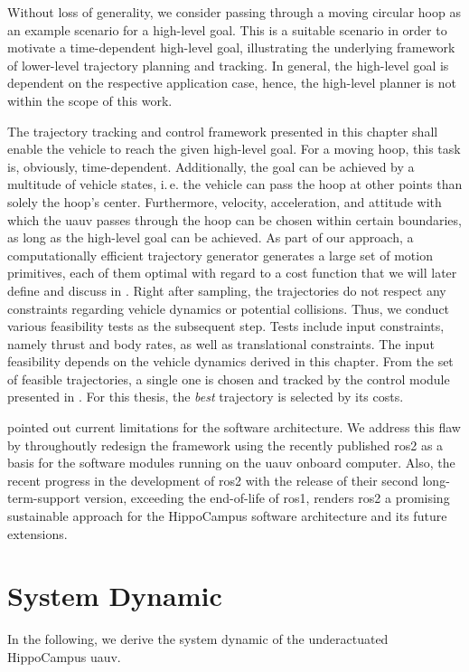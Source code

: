 Without loss of generality, we consider passing through a moving circular hoop as an example scenario for a high-level goal. This is a suitable scenario in order to motivate a time-dependent high-level goal, illustrating the underlying framework of lower-level trajectory planning and tracking. In general, the high-level goal is dependent on the respective application case, hence, the high-level planner is not within the scope of this work.

The trajectory tracking and control framework presented in this chapter shall enable the vehicle to reach the given high-level goal. For a moving hoop, this task is, obviously, time-dependent. Additionally, the goal can be achieved by a multitude of vehicle states, i.\,e. the vehicle can pass the hoop at other points than solely the hoop's center.
Furthermore, velocity, acceleration, and attitude with which the \ac{uauv} passes through the hoop can be chosen within certain boundaries, as long as the high-level goal can be achieved.
As part of our approach, a computationally efficient trajectory generator generates a large set of motion primitives, each of them optimal with regard to a cost function that we will later define and discuss in .
Right after sampling, the trajectories do not respect any constraints regarding vehicle dynamics or potential collisions. 
Thus, we conduct various feasibility tests as the subsequent step.
Tests include input constraints, namely thrust and body rates, as well as translational constraints.
The input feasibility depends on the vehicle dynamics derived in this chapter.
From the set of feasible trajectories, a single one is chosen and tracked by the control module presented in . 
For this thesis, the \emph{best} trajectory is selected by its costs.

 pointed out current limitations for the software architecture.
We address this flaw by throughoutly redesign the framework using the recently published \ac{ros2} as a basis for the software modules running on the \ac{uauv} onboard computer.
Also, the recent progress in the development of \ac{ros2} with the release of their second long-term-support version, exceeding the end-of-life of \ac{ros}1, renders \ac{ros2} a promising sustainable approach for the HippoCampus software architecture and its future extensions.

\section{System Dynamic}
\label{sec:system-dynamics}
In the following, we derive the system dynamic of the underactuated HippoCampus \ac{uauv}.

